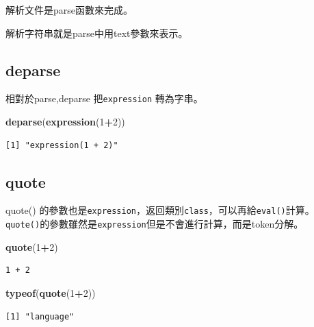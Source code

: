 \documentclass[]{book}
\newenvironment{Shaded}{\begin{snugshade}}{\end{snugshade}}
\newcommand{\DecValTok}[1]{\textcolor[rgb]{0.00,0.00,0.81}{#1}}
\newcommand{\KeywordTok}[1]{\textcolor[rgb]{0.13,0.29,0.53}{\textbf{#1}}}
\newcommand{\NormalTok}[1]{#1}
\newcommand{\OperatorTok}[1]{\textcolor[rgb]{0.81,0.36,0.00}{\textbf{#1}}}
\theoremstyle{definition}
\theoremstyle{definition}
\theoremstyle{definition}
\theoremstyle{remark}
\begin{document}
解析文件是parse函數來完成。

解析字符串就是parse中用text參數來表示。

\hypertarget{deparse}{%
\subsection{\texorpdfstring{\textbf{deparse}}{deparse}}\label{deparse}}

相對於parse,deparse 把\texttt{expression} 轉為字串。

\begin{Shaded}
\begin{Highlighting}[]
 \KeywordTok{deparse}\NormalTok{(}\KeywordTok{expression}\NormalTok{(}\DecValTok{1}\OperatorTok{+}\DecValTok{2}\NormalTok{))}
\end{Highlighting}
\end{Shaded}

\begin{verbatim}
[1] "expression(1 + 2)"
\end{verbatim}

\hypertarget{quote}{%
\subsection{\texorpdfstring{\textbf{quote}}{quote}}\label{quote}}

quote()
的參數也是\texttt{expression}，返回類別\texttt{class}，可以再給\texttt{eval()}計算。
\texttt{quote()}的參數雖然是\texttt{expression}但是不會進行計算，而是token分解。

\begin{Shaded}
\begin{Highlighting}[]
 \KeywordTok{quote}\NormalTok{(}\DecValTok{1}\OperatorTok{+}\DecValTok{2}\NormalTok{)}
\end{Highlighting}
\end{Shaded}

\begin{verbatim}
1 + 2
\end{verbatim}

\begin{Shaded}
\begin{Highlighting}[]
 \KeywordTok{typeof}\NormalTok{(}\KeywordTok{quote}\NormalTok{(}\DecValTok{1}\OperatorTok{+}\DecValTok{2}\NormalTok{)) }
\end{Highlighting}
\end{Shaded}

\begin{verbatim}
[1] "language"
\end{verbatim}
\end{document}
